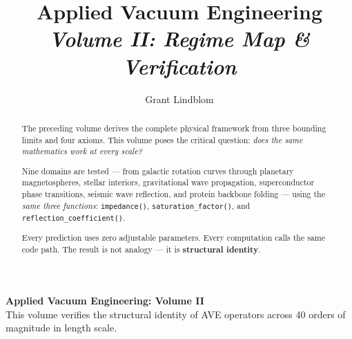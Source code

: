 \title{\textbf{Applied Vacuum Engineering} \\ \large \textit{Volume II: Regime Map \& Verification}}
\author{Grant Lindblom}
\date{}

\maketitle

\vfill
\noindent\textbf{Applied Vacuum Engineering: Volume II} \\
This volume verifies the structural identity of AVE operators across 40 orders of magnitude in length scale.

\begin{abstract}
    The preceding volume derives the complete physical framework from three bounding limits and four axioms. This volume poses the critical question: \textit{does the same mathematics work at every scale?}

    Nine domains are tested --- from galactic rotation curves through planetary magnetospheres, stellar interiors, gravitational wave propagation, superconductor phase transitions, seismic wave reflection, and protein backbone folding --- using the \textit{same three functions}: \texttt{impedance()}, \texttt{saturation\_factor()}, and \texttt{reflection\_coefficient()}.

    Every prediction uses zero adjustable parameters. Every computation calls the same code path. The result is not analogy --- it is \textbf{structural identity}.
\end{abstract}
